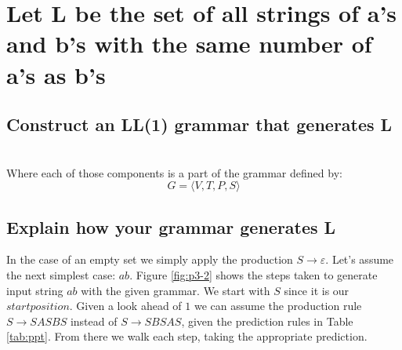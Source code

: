 \documentclass{article}
\begin{document}
\newpage
\section[Problem 3]{Let L be the set of all strings of a's and b's with the 
same number of a's as b's}
\subsection[LL1 Grammar]{Construct an LL(1) grammar that generates L}
\\

\noindent Where each of those components is a part of the grammar defined by:
\begin{equation}
G = \langle V, T, P, S \rangle
\end{equation}

\subsection[Generation Explanation]{Explain how your grammar generates L}
In the case of an empty set we simply apply the production $S \to \varepsilon$. 
Let's assume the next simplest case: $ab$. Figure \ref{fig:p3-2} shows the steps 
taken to generate input string $ab$ with the given grammar. We start with $S$ 
since it is our $start position$. Given a look ahead of $1$ we can assume the 
production rule $S \to SASBS$ instead of $S \to SBSAS$, given the prediction 
rules in Table \ref{tab:ppt}. From there we walk each step, taking the 
appropriate prediction.
\end{document}
